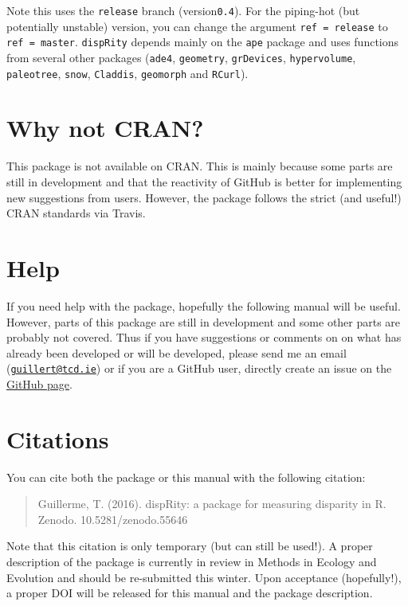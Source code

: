 \documentclass[]{book}
\theoremstyle{definition}
\theoremstyle{definition}
\theoremstyle{remark}
\begin{document}
Note this uses the \texttt{release} branch (version\texttt{0.4}). For
the piping-hot (but potentially unstable) version, you can change the
argument \texttt{ref\ =\ release} to \texttt{ref\ =\ master}.
\texttt{dispRity} depends mainly on the \texttt{ape} package and uses
functions from several other packages (\texttt{ade4}, \texttt{geometry},
\texttt{grDevices}, \texttt{hypervolume}, \texttt{paleotree},
\texttt{snow}, \texttt{Claddis}, \texttt{geomorph} and \texttt{RCurl}).

\section{Why not CRAN?}\label{why-not-cran}

This package is not available on CRAN. This is mainly because some parts
are still in development and that the reactivity of GitHub is better for
implementing new suggestions from users. However, the package follows
the strict (and useful!) CRAN standards via Travis.

\section{Help}\label{help}

If you need help with the package, hopefully the following manual will
be useful. However, parts of this package are still in development and
some other parts are probably not covered. Thus if you have suggestions
or comments on on what has already been developed or will be developed,
please send me an email
(\href{mailto:guillert@tcd.ie}{\nolinkurl{guillert@tcd.ie}}) or if you
are a GitHub user, directly create an issue on the
\href{https://github.com/TGuillerme/dispRity}{GitHub page}.

\section{Citations}\label{citations}

You can cite both the package or this manual with the following
citation:

\begin{quote}
Guillerme, T. (2016). dispRity: a package for measuring disparity in R.
Zenodo. 10.5281/zenodo.55646
\end{quote}

Note that this citation is only temporary (but can still be used!). A
proper description of the package is currently in review in Methods in
Ecology and Evolution and should be re-submitted this winter. Upon
acceptance (hopefully!), a proper DOI will be released for this manual
and the package description.
\end{document}

